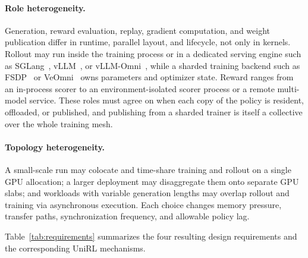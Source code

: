 \documentclass[10pt]{article}
\newcommand{\system}{UniRL\xspace}
\begin{document}
\paragraph{Role heterogeneity.}
Generation, reward evaluation, replay, gradient computation, and weight publication differ in runtime, parallel layout, and lifecycle, not only in kernels.
Rollout may run inside the training process or in a dedicated serving engine such as SGLang~\citep{zheng2024sglang}, vLLM~\citep{kwon2023vllm}, or vLLM-Omni~\citep{yin2026vllmomni}, while a sharded training backend such as FSDP~\citep{zhao2023fsdp} or VeOmni~\citep{ma2025veomni} owns parameters and optimizer state.
Reward ranges from an in-process scorer to an environment-isolated scorer process or a remote multi-model service.
These roles must agree on when each copy of the policy is resident, offloaded, or published, and publishing from a sharded trainer is itself a collective over the whole training mesh.

\paragraph{Topology heterogeneity.}
A small-scale run may colocate and time-share training and rollout on a single GPU allocation; a larger deployment may disaggregate them onto separate GPU slabs; and workloads with variable generation lengths may overlap rollout and training via asynchronous execution.
Each choice changes memory pressure, transfer paths, synchronization frequency, and allowable policy lag.

Table~\ref{tab:requirements} summarizes the four resulting design requirements and the corresponding \system mechanisms.
\end{document}
